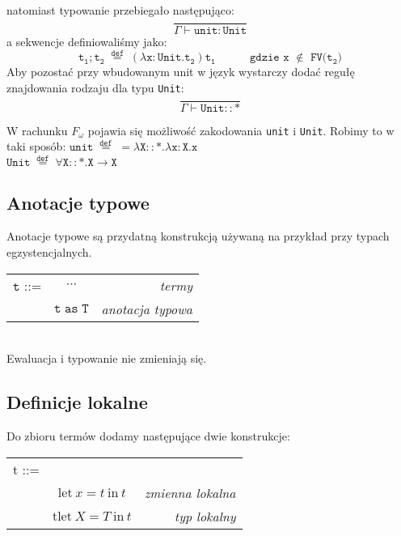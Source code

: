 \documentclass[11pt,leqno]{article}
\begin{document}
natomiast typowanie przebiegało następująco:~\[\mathtt{ \frac{}{\Gamma \vdash unit:Unit}
		}
	\]
a sekwencje definiowaliśmy jako:~\[\mathtt{ t_1;t_2 \;\overset{def}{=}\; (\lambda x:Unit.t_2)t_1 \hspace{3em} \text{gdzie x $\notin$ FV($t_2$)}
		}
	\]
Aby pozostać przy wbudowanym unit w język wystarczy dodać regułę znajdowania rodzaju dla typu \texttt{Unit}:~\[\mathtt{ \frac{}{\Gamma \vdash Unit::\ast}
		}
	\]

W rachunku $F_\omega$ pojawia się możliwość zakodowania \texttt{unit} i \texttt{Unit}. Robimy to w taki sposób:
$\mathtt{unit \;\overset{def}{=}\;= \lambda X::\ast.\lambda x:X.x}$ \\
$\mathtt{Unit \;\overset{def}{=}\; \forall X::\ast.X \rightarrow X}$ \\


\subsection{Anotacje typowe}

Anotacje typowe są przydatną konstrukcją używaną na przykład przy typach egzystencjalnych.\\
\begin{tabular}{| l c r |}
  \hline
  $\mathtt{t}$ ::= & $\cdots$ & \textit{termy}  \\
   & $\mathtt{t\;as\;T}$ &\textit{anotacja typowa} \\
  \hline
\end{tabular} \\

Ewaluacja i typowanie nie zmieniają się.

\subsection{Definicje lokalne}

Do zbioru termów dodamy następujące dwie konstrukcje:\\

\begin{tabular}{| l c r |}
  \hline
  t ::= &  &  \\
   & $\textrm{let} \ x = t \ \textrm{in} \ t$ & \textit{zmienna lokalna} \\
   & $\textrm{tlet} \ X = T \ \textrm{in} \ t$ & \textit{typ lokalny} \\
  \hline
\end{tabular} \\
\end{document}
